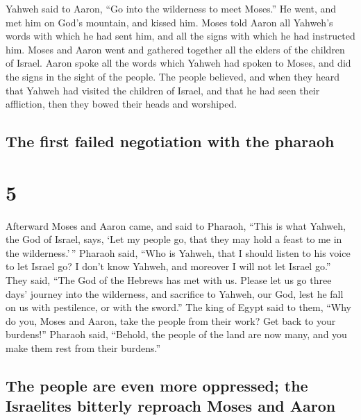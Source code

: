  Yahweh said to Aaron, ``Go into the wilderness to meet
Moses.'' He went, and met him on God's mountain, and kissed him.
 Moses told Aaron all Yahweh's words with which he had
sent him, and all the signs with which he had instructed him.
 Moses and Aaron went and gathered together all the
elders of the children of Israel.  Aaron spoke all the
words which Yahweh had spoken to Moses, and did the signs in the sight
of the people.  The people believed, and when they heard
that Yahweh had visited the children of Israel, and that he had seen
their affliction, then they bowed their heads and worshiped.

\hypertarget{the-first-failed-negotiation-with-the-pharaoh}{%
\subsection{The first failed negotiation with the
pharaoh}\label{the-first-failed-negotiation-with-the-pharaoh}}

\hypertarget{section-4}{%
\section{5}\label{section-4}}

 Afterward Moses and Aaron came, and said to Pharaoh,
``This is what Yahweh, the God of Israel, says, `Let my people go, that
they may hold a feast to me in the wilderness.'\,'' 
Pharaoh said, ``Who is Yahweh, that I should listen to his voice to let
Israel go? I don't know Yahweh, and moreover I will not let Israel go.''
 They said, ``The God of the Hebrews has met with us.
Please let us go three days' journey into the wilderness, and sacrifice
to Yahweh, our God, lest he fall on us with pestilence, or with the
sword.''  The king of Egypt said to them, ``Why do you,
Moses and Aaron, take the people from their work? Get back to your
burdens!''  Pharaoh said, ``Behold, the people of the land
are now many, and you make them rest from their burdens.''

\hypertarget{the-people-are-even-more-oppressed-the-israelites-bitterly-reproach-moses-and-aaron}{%
\subsection{The people are even more oppressed; the Israelites bitterly
reproach Moses and
Aaron}\label{the-people-are-even-more-oppressed-the-israelites-bitterly-reproach-moses-and-aaron}}

